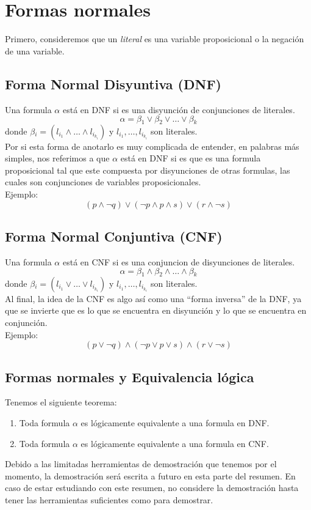 \documentclass[../main.tex]{subfiles}
\begin{document}
\section{Formas normales}
Primero, consideremos que un \textit{literal} es una variable proposicional o la negación de una variable.\\
\subsection{Forma Normal Disyuntiva (DNF)}
Una formula $\alpha$ está en DNF si es una disyunción de conjunciones de literales.
$$\alpha{} = \beta{}_{1} \vee{} \beta{}_{2} \vee{} \ldots{} \vee{} \beta{}_{k}$$
donde $\beta{}_{i} = (l_{i_{1}} \wedge{} \ldots{} \wedge{} l_{i_{k_{i}}})$ y $l_{i_{1}}, \ldots{}, l_{i_{k_{i}}}$ son literales.\\
Por si esta forma de anotarlo es muy complicada de entender, en palabras más simples, nos referimos a que $\alpha$ está en DNF si es que es una formula proposicional tal que este compuesta por disyunciones de otras formulas, las cuales son conjunciones de variables proposicionales.\\
Ejemplo:
    $$(p \wedge{} \neg{} q) \vee{} (\neg{} p \wedge{} p \wedge{} s) \vee{} (r \wedge{} \neg{} s)$$

\subsection{Forma Normal Conjuntiva (CNF)}
Una formula $\alpha$ está en CNF si es una conjuncion de disyunciones de literales.
$$\alpha{} = \beta{}_{1} \wedge{} \beta{}_{2} \wedge{} \ldots{} \wedge{} \beta{}_{k}$$
donde $\beta{}_{i} = (l_{i_{1}} \vee{} \ldots{} \vee{} l_{i_{k_{i}}})$ y $l_{i_{1}}, \ldots{}, l_{i_{k_{i}}}$ son literales.\\
Al final, la idea de la CNF es algo así como una ``forma inversa'' de la DNF, ya que se invierte que es lo que se encuentra en disyunción y lo que se encuentra en conjunción.\\
Ejemplo:
    $$(p \vee{} \neg{} q) \wedge{} (\neg{} p \vee{} p \vee{} s) \wedge{} (r \vee{} \neg{} s)$$

\subsection{Formas normales y Equivalencia lógica}
Tenemos el siguiente teorema:
\begin{enumerate}
    \item Toda formula $\alpha$ es lógicamente equivalente a una formula en DNF.
    \item Toda formula $\alpha$ es lógicamente equivalente a una formula en CNF.
\end{enumerate}
Debido a las limitadas herramientas de demostración que tenemos por el momento, la demostración será escrita a futuro en esta parte del resumen. En caso de estar estudiando con este resumen, no considere la demostración hasta tener las herramientas suficientes como para demostrar.
\end{document}
